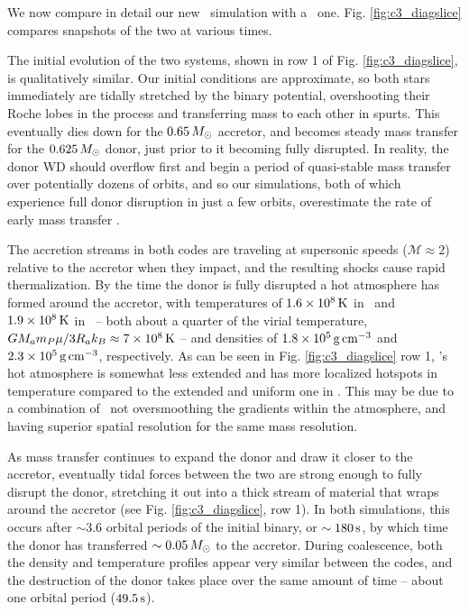 We now compare in detail our new \arepo\ simulation with a \gasoline\ one.  Fig. \ref{fig:c3_diagslice} compares snapshots of the two at various times.

The initial evolution of the two systems, shown in row 1 of Fig. \ref{fig:c3_diagslice}, is qualitatively similar.  Our initial conditions are approximate, so both stars immediately are tidally stretched by the binary potential, overshooting their Roche lobes in the process and transferring mass to each other in spurts.  This eventually dies down for the $0.65\,\Msun$ accretor, and becomes steady mass transfer for the $0.625\,\Msun$ donor, just prior to it becoming fully disrupted.  In reality, the donor WD should overflow first and begin a period of quasi-stable mass transfer over potentially dozens of orbits, and so our simulations, both of which experience full donor disruption in just a few orbits, overestimate the rate of early mass transfer \citep{dan+11}.


The accretion streams in both codes are traveling at supersonic speeds ($\mathcal{M} \approx 2$) relative to the accretor when they impact, and the resulting shocks cause rapid thermalization.  By the time the donor is fully disrupted a hot atmosphere has formed around the accretor, with temperatures of $1.6 \times 10^8\,\mathrm{K}$ in  \arepo\ and $1.9\times 10^8\,\mathrm{K}$ in \gasoline\ -- both about a quarter of the virial temperature, $GM_am_P\mu/3R_ak_B \approx 7 \times 10^8\,\mathrm{K}$ -- and densities of $1.8\times10^5\,\gcc$ and $2.3\times10^5\,\gcc$, respectively.  As can be seen in Fig. \ref{fig:c3_diagslice} row 1, \arepo's hot atmosphere is somewhat less extended and has more localized hotspots in temperature compared to the extended and uniform one in \gasoline.  This may be due to a combination of \arepo\ not oversmoothing the gradients within the atmosphere, and having superior spatial resolution for the same mass resolution.


As mass transfer continues to expand the donor and draw it closer to the accretor, eventually tidal forces between the two are strong enough to fully disrupt the donor, stretching it out into a thick stream of material that wraps around the accretor (see Fig. \ref{fig:c3_diagslice}, row 1).  In both simulations, this occurs after $\sim3.6$ orbital periods of the initial binary, or $\sim180\,\mathrm{s}$, by which time the donor has transferred $\sim0.05\,\Msun$ to the accretor.  During coalescence, both the density and temperature profiles appear very similar between the codes, and the destruction of the donor takes place over the same amount of time -- about one orbital period ($49.5\,\mathrm{s}$).

